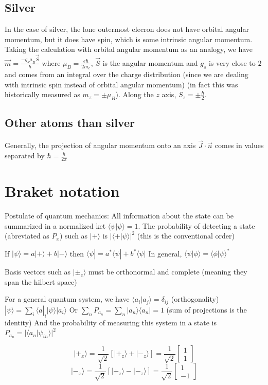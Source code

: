 \documentclass{homework}
\newcommand{\m}[1]{\begin{bmatrix} #1 \end{bmatrix}}
\newcommand{\kt}{\rangle}
\newcommand{\br}{\langle}
\newcommand{\bra}[1]{ \langle #1 |}
\begin{document}
\subsection{Silver}

In the case of silver, the lone outermost elecron does not have orbital angular momentum, but it does have spin, which is some intrinsic angular momentum. Taking the calculation with orbital angular momentum as an analogy, we have $\vec{m} = \frac{-g_s \mu_B \vec{S}}{\hbar}$ where $\mu_B = \frac{e \hbar}{2m_e}$, $\vec{S}$ is the angular momentum and $g_s$ is very close to $2$ and comes from an integral over the charge distribution (since we are dealing with intrinsic spin instead of orbital angular momentum) (in fact this was historically measured as $m_z = \pm \mu_B$). Along the $z$ axis, $S_z = \pm \frac{\hbar}{2}$.

\subsection{Other atoms than silver}

Generally, the projection of angular momentum onto an axis $\vec{J} \cdot \vec{n}$ comes in values separated by $\hbar = \frac{h}{2\pi}$

\section{Braket notation}

Postulate of quantum mechanics: 
All information about the state can be summarized in a normalized ket $\br \psi | \psi \kt = 1$. 
The probability of detecting a state (abreviated as $P_x$) such as $| + \kt$ is $| \br + | \psi \kt |^2$ (this is the conventional order)

If $|\psi \kt = a | + \kt + b | - \kt$ then $\br \psi | = a^* \br \psi | + b^* \br \psi |$
In general, $\br \psi | \phi \kt = \br  \phi | \psi \kt^*$

Basis vectors such as $| \pm_z \kt$ must be orthonormal and complete (meaning they span the hilbert space)

For a general quantum system, we have 
$\br a_i | a_j \kt = \delta_{ij}$ (orthogonality)
$| \psi \kt = \sum_i \bra a_i | \psi \kt |a_i \kt$
Or
$\sum_n P_{a_n} = \sum_n |a_n \kt \br a_n | = 1$ (sum of projections is the identity)
And the probability of measuring this system in a state is 
$P_{a_n} = |\br a_n | \psi_{in} \kt|^2$


\[| +_x \kt = \frac{1}{\sqrt{2}}[|+_z \kt + |-_z \kt] = \frac{1}{\sqrt{2}} \m{ 1\\ 1}\]
\[| -_x \kt = \frac{1}{\sqrt{2}}[|+_z \kt - |-_z \kt]= \frac{1}{\sqrt{2}} \m{ 1\\ -1}\]
\end{document}
